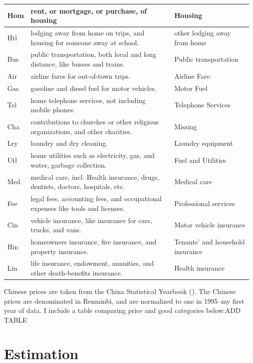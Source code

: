 \documentclass[12pt]{article}
\begin{document}
\begin{table}
\begin{sideways}
\begin{tabular}{|l|l|l|}
\hline
Hom & rent, or mortgage, or purchase, of housing & Housing\\ 
\hline
Htl & lodging away from home on trips, and housing for someone away at school. & other lodging away from home\\ 
\hline
Bus & public transportation, both local and long distance, like busses and trains. & Public transportation\\ 
\hline
Air & airline fares for out-of-town trips. & Airline Fare\\ 
\hline
Gas & gasoline and diesel fuel for motor vehicles. & Motor Fuel\\ 
\hline
Tel & home telephone services, not including mobile phones. & Telephone Services\\ 
\hline
Cha & contributions to churches or other religious organizations, and other charities. & Missing\\ 
\hline
Lry & laundry and dry cleaning. & Laundry equipment\\ 
\hline
Utl & home utilities such as electricity, gas, and water, garbage collection. & Fuel and Utilities\\ 
\hline
Med & medical care, incl. Health insurance, drugs, dentists, doctors, hospitals, etc. & Medical care\\ 
\hline
Fee & legal fees, accounting fees, and occupational expenses like tools and licenses. & Professional services\\ 
\hline
Cin & vehicle insurance, like insurance for cars, trucks, and vans. & Motor vehicle insurance\\ 
\hline
Hin & homeowners insurance, fire insurance, and property insurance. & Tenants' and household insurance\\ 
\hline
Lin & life insurance, endowment, annuities, and other death-benefits insurance. & Health insurance\\ 
\hline
\end{tabular}
\end{sideways}
\end{table}

Chinese prices are taken from the China Statistical Yearbook (\citep{CSY}).  The Chinese prices are denominated in Renminbi, and are normalized to one in 1995--my first year of data. I include a table comparing price and good categories below:ADD TABLE 

\section{Estimation}
\end{document}
